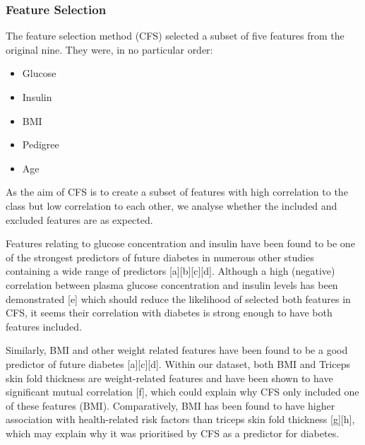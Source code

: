 \subsubsection{Feature Selection}


The feature selection method (CFS) selected a subset of five features from the original nine. They were, in no particular order:

\begin{itemize}
    \item Glucose
    \item Insulin
    \item BMI
    \item Pedigree
    \item Age
\end{itemize}

As the aim of CFS is to create a subset of features with high correlation to the class but low correlation to each other, we analyse whether the included and excluded features are as expected.

Features relating to glucose concentration and insulin have been found to be one of the strongest predictors of future diabetes in numerous other studies containing a wide range of predictors [a][b][c][d]. Although a high (negative) correlation between plasma glucose concentration and insulin levels has been demonstrated [e] which should reduce the likelihood of selected both features in CFS, it seems their correlation with diabetes is strong enough to have both features included. 

Similarly, BMI and other weight related features have been found to be a good predictor of future diabetes [a][c][d]. Within our dataset, both BMI and Triceps skin fold thickness are weight-related features and have been shown to have significant mutual correlation [f], which could explain why CFS only included one of these features (BMI). Comparatively, BMI has been found to have higher association with health-related risk factors than triceps skin fold thickness [g][h], which may explain why it was prioritised by CFS as a predictor for diabetes.

